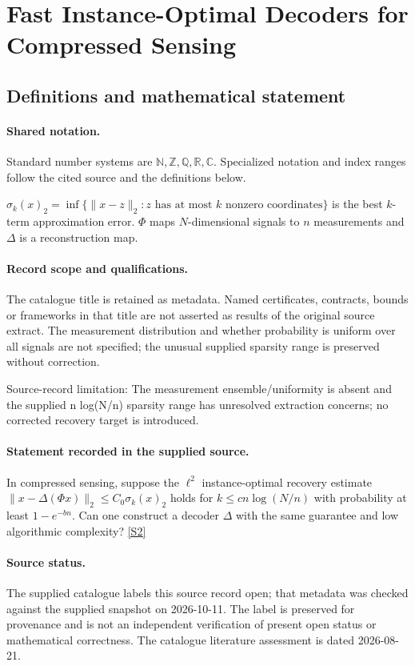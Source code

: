 \documentclass[11pt]{article}
\newcommand{\sref}[2]{\hyperlink{source:#1:#2}{[S#2]}}
\begin{document}
\section{Fast Instance-Optimal Decoders for Compressed Sensing}\label{statement}

\subsection{Definitions and mathematical statement}

\paragraph{Shared notation.}Standard number systems are $\mathbb N,\mathbb Z,\mathbb Q,\mathbb R,\mathbb C$. Specialized notation and index ranges follow the cited source and the definitions below.


$\sigma_k(x)_2=\inf\{\lVert x-z\rVert_2:z\text{ has at most }k\text{ nonzero coordinates}\}$ is the best $k$-term approximation error. $\Phi$ maps $N$-dimensional signals to $n$ measurements and $\Delta$ is a reconstruction map.
\paragraph{Record scope and qualifications.}
The catalogue title is retained as metadata. Named certificates, contracts, bounds or frameworks in that title are not asserted as results of the original source extract.
The measurement distribution and whether probability is uniform over all signals are not specified; the unusual supplied sparsity range is preserved without correction.

Source-record limitation: The measurement ensemble/uniformity is absent and the supplied n log(N/n) sparsity range has unresolved extraction concerns; no corrected recovery target is introduced.
\paragraph{Statement recorded in the supplied source.}
In compressed sensing, suppose the $\ell^2$ instance-optimal recovery estimate $\lVert x-\Delta(\Phi x)\rVert_2\leq C_0\sigma_k(x)_2$ holds for $k\leq cn\log(N/n)$ with probability at least $1-e^{-bn}$. Can one construct a decoder $\Delta$ with the same guarantee and low algorithmic complexity? \sref{statement}{2}
\paragraph{Source status.}
The supplied catalogue labels this source record open; that metadata was checked against the supplied snapshot on 2026-10-11. The label is preserved for provenance and is not an independent verification of present open status or mathematical correctness. The catalogue literature assessment is dated 2026-08-21.
\end{document}
